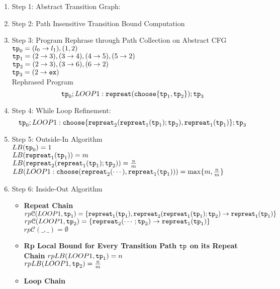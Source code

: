 \begin{enumerate}
  \item Step 1: Abstract Transition Graph:

\item Step 2: Path Insensitive Transition Bound Computation

\item Step 3: Program Rephrase through Path Collection on Abstract CFG
\\
$\mathtt{tp}_0 = (l_0 \to l_1), (1, 2)$
\\
$\mathtt{tp}_1 = (2 \to 3), (3 \to 4), (4 \to 5), (5 \to 2)$
\\
$\mathtt{tp}_2 = (2 \to 3), (3 \to 6), (6 \to 2)$
\\
$\mathtt{tp}_3 = (2 \to \mathtt{ex})$
\\
Rephrased Program
\[
\mathtt{tp}_0 ; LOOP1: \mathtt{repreat}(\mathtt{choose}\{\mathtt{tp}_1, \mathtt{tp}_2 \}); \mathtt{tp}_3
\]
\item Step 4: While Loop Refinement:
\[
  \mathtt{tp}_0 ; LOOP1: \mathtt{choose}\{\mathtt{repreat}_2(\mathtt{repreat}_1(\mathtt{tp}_1); \mathtt{tp}_2) , \mathtt{repreat}_1(\mathtt{tp}_1) \}; \mathtt{tp}_3
  \]
\item Step 5: Outside-In Algorithm
\\
$LB(\mathtt{tp}_0) = 1$
\\
$LB(\mathtt{repreat}_1(\mathtt{tp}_1)) = m $
\\
$LB(\mathtt{repreat}_2(\mathtt{repreat}_1(\mathtt{tp}_1); \mathtt{tp}_2)) = \frac{n}{m} $
\\
$LB(LOOP1: \mathtt{choose}(\mathtt{repreat}_2(\cdots), \mathtt{repreat}_1(\mathtt{tp}_1))) 
= \max\{m, \frac{n}{m}\} $
\\
\item Step 6: Inside-Out Algorithm
\begin{itemize}
  \item \textbf{Repeat Chain}
  \\
  $rp\mathcal{C}(LOOP1, \mathtt{tp}_1) = \{\mathtt{repreat}_1(\mathtt{tp}_1), \mathtt{repreat}_2(\mathtt{repreat}_1(\mathtt{tp}_1); \mathtt{tp}_2) \to \mathtt{repreat}_1(\mathtt{tp}_1)\}$ \\
  $rp\mathcal{C}(LOOP1, \mathtt{tp}_2) = \{\mathtt{repreat}_2(\cdots; \mathtt{tp}_2) \to \mathtt{repreat}_1(\mathtt{tp}_1)\}$ \\
  $rp\mathcal{C}(\_, \_) = \emptyset$ 
  \item \textbf{Rp Local Bound for Every Transition Path $\mathtt{tp}$ on its Repeat Chain}
  $rpLB(LOOP1, \mathtt{tp}_1) = n$ \\
  $rpLB(LOOP1, \mathtt{tp}_2) = \frac{n}{m}$ 
  \item \textbf{Loop Chain}
  \\

\end{itemize}
\end{enumerate}
